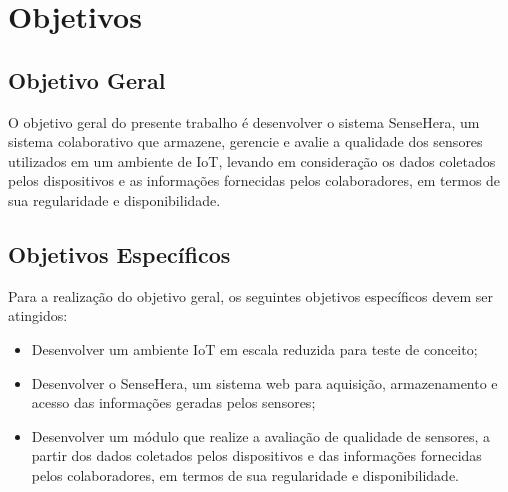 \section{Objetivos}
\label{sec:objetivo}
\subsection{Objetivo Geral}
\null \quad O objetivo geral do presente trabalho é desenvolver o sistema SenseHera, um sistema colaborativo que armazene, gerencie e avalie a qualidade dos sensores utilizados em um ambiente de \acrlong{IoT}, levando em consideração os dados coletados pelos dispositivos e as informações fornecidas pelos colaboradores, em termos de sua regularidade e disponibilidade.
\subsection{Objetivos Específicos}
\null \quad Para a realização do objetivo geral, os seguintes objetivos específicos devem ser atingidos:
\begin{itemize}
  \item Desenvolver um ambiente \acrshort{IoT} em escala reduzida para teste de conceito;
  \item Desenvolver o SenseHera, um sistema web para aquisição, armazenamento e acesso das informações geradas pelos sensores;
  \item Desenvolver um módulo que realize a avaliação de qualidade de sensores, a partir dos dados coletados pelos dispositivos e das informações fornecidas pelos colaboradores, em termos de sua regularidade e disponibilidade.
\end{itemize}
